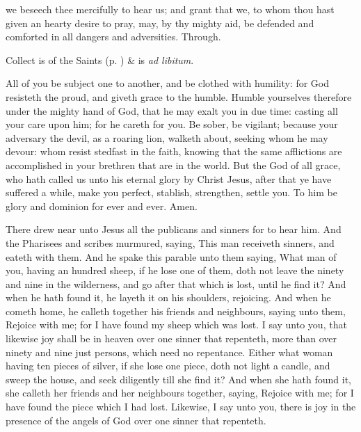 \collect\label{TrinityIIICollect}
 we beseech thee mercifully to hear us; and grant that we, to whom thou hast given an hearty desire to pray, may, by thy mighty aid, be defended and comforted in all dangers and adversities. Through.
\begin{rubric}
     Collect is of the Saints (p. \pageref{SPSaints}) \&  is \emph{ad libitum}.
\end{rubric}

 All of you be subject one to another, and be clothed with humility: for God resisteth the proud, and giveth grace to the humble. Humble yourselves therefore under the mighty hand of God, that he may exalt you in due time: casting all your care upon him; for he careth for you. Be sober, be vigilant; because your adversary the devil, as a roaring lion, walketh about, seeking whom he may devour: whom resist stedfast in the faith, knowing that the same afflictions are accomplished in your brethren that are in the world. But the God of all grace, who hath called us unto his eternal glory by Christ Jesus, after that ye have suffered a while, make you perfect, stablish, strengthen, settle you. To him be glory and dominion for ever and ever. Amen.


 There drew near unto Jesus all the publicans and sinners for to hear him. And the Pharisees and scribes murmured, saying, This man receiveth sinners, and eateth with them. And he spake this parable unto them saying, What man of you, having an hundred sheep, if he lose one of them, doth not leave the ninety and nine in the wilderness, and go after that which is lost, until he find it? And when he hath found it, he layeth it on his shoulders, rejoicing. And when he cometh home, he calleth together his friends and neighbours, saying unto them, Rejoice with me; for I have found my sheep which was lost. I say unto you, that likewise joy shall be in heaven over one sinner that repenteth, more than over ninety and nine just persons, which need no repentance. Either what woman having ten pieces of silver, if she lose one piece, doth not light a candle, and sweep the house, and seek diligently till she find it? And when she hath found it, she calleth her friends and her neighbours together, saying, Rejoice with me; for I have found the piece which I had lost. Likewise, I say unto you, there is joy in the presence of the angels of God over one sinner that repenteth.

